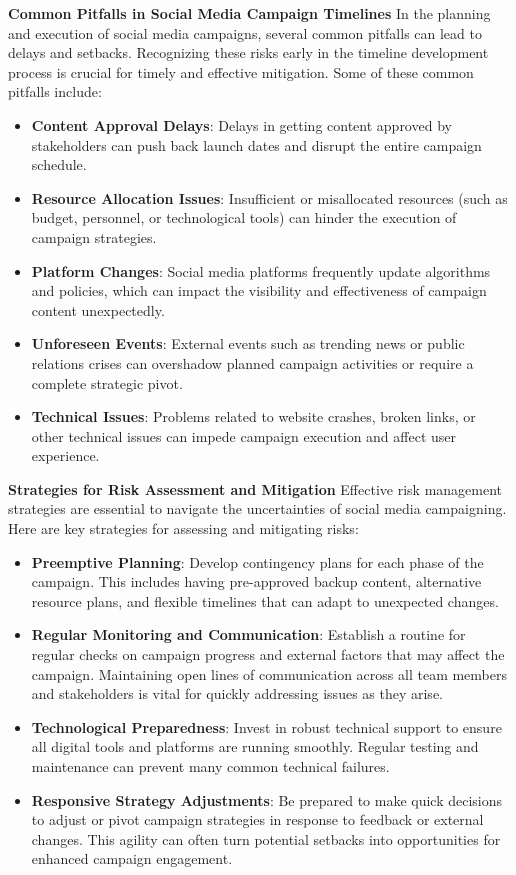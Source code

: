 \documentclass[
]{book}
\providecommand{\tightlist}{%
  \setlength{\itemsep}{0pt}\setlength{\parskip}{0pt}}
\begin{document}
\textbf{Common Pitfalls in Social Media Campaign Timelines}
In the planning and execution of social media campaigns, several common pitfalls can lead to delays and setbacks. Recognizing these risks early in the timeline development process is crucial for timely and effective mitigation. Some of these common pitfalls include:

\begin{itemize}
\tightlist
\item
  \textbf{Content Approval Delays}: Delays in getting content approved by stakeholders can push back launch dates and disrupt the entire campaign schedule.
\item
  \textbf{Resource Allocation Issues}: Insufficient or misallocated resources (such as budget, personnel, or technological tools) can hinder the execution of campaign strategies.
\item
  \textbf{Platform Changes}: Social media platforms frequently update algorithms and policies, which can impact the visibility and effectiveness of campaign content unexpectedly.
\item
  \textbf{Unforeseen Events}: External events such as trending news or public relations crises can overshadow planned campaign activities or require a complete strategic pivot.
\item
  \textbf{Technical Issues}: Problems related to website crashes, broken links, or other technical issues can impede campaign execution and affect user experience.
\end{itemize}

\textbf{Strategies for Risk Assessment and Mitigation}
Effective risk management strategies are essential to navigate the uncertainties of social media campaigning. Here are key strategies for assessing and mitigating risks:

\begin{itemize}
\tightlist
\item
  \textbf{Preemptive Planning}: Develop contingency plans for each phase of the campaign. This includes having pre-approved backup content, alternative resource plans, and flexible timelines that can adapt to unexpected changes.
\item
  \textbf{Regular Monitoring and Communication}: Establish a routine for regular checks on campaign progress and external factors that may affect the campaign. Maintaining open lines of communication across all team members and stakeholders is vital for quickly addressing issues as they arise.
\item
  \textbf{Technological Preparedness}: Invest in robust technical support to ensure all digital tools and platforms are running smoothly. Regular testing and maintenance can prevent many common technical failures.
\item
  \textbf{Responsive Strategy Adjustments}: Be prepared to make quick decisions to adjust or pivot campaign strategies in response to feedback or external changes. This agility can often turn potential setbacks into opportunities for enhanced campaign engagement.
\end{itemize}
\end{document}
